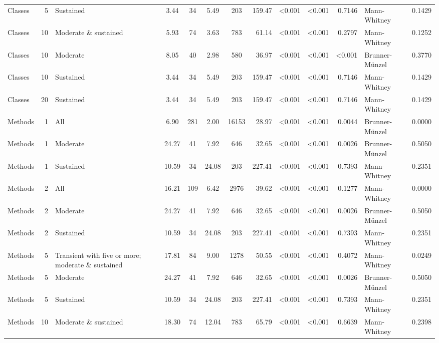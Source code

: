 \begin{table}[H]
{\begin{tabular}{l r p{4cm} c c c c r r r r l r}
Classes & 5 & Sustained &  3.44 & 34 & 5.49 & 203 & 159.47 & \textless 0.001 & \textless 0.001 & 0.7146 &  Mann-Whitney & 0.1429 \\ 
Classes & 10 & Moderate \& sustained &  5.93 & 74 & 3.63 & 783 & 61.14 & \textless 0.001 & \textless 0.001 & 0.2797 &  Mann-Whitney & 0.1252 \\ 
Classes & 10 & Moderate &  8.05 & 40 & 2.98 & 580 & 36.97 & \textless 0.001 & \textless 0.001 & \textless 0.001 &  Brunner-Münzel & 0.3770 \\ 
Classes & 10 & Sustained &  3.44 & 34 & 5.49 & 203 & 159.47 & \textless 0.001 & \textless 0.001 & 0.7146 &  Mann-Whitney & 0.1429 \\ 
Classes & 20 & Sustained &  3.44 & 34 & 5.49 & 203 & 159.47 & \textless 0.001 & \textless 0.001 & 0.7146 &  Mann-Whitney & 0.1429 \\ 
Methods & 1 & All &  6.90 & 281 & 2.00 & 16153 & 28.97 & \textless 0.001 & \textless 0.001 & 0.0044 &  Brunner-Münzel & 0.0000 \\ 
Methods & 1 & Moderate &  24.27 & 41 & 7.92 & 646 & 32.65 & \textless 0.001 & \textless 0.001 & 0.0026 &  Brunner-Münzel & 0.5050 \\ 
Methods & 1 & Sustained &  10.59 & 34 & 24.08 & 203 & 227.41 & \textless 0.001 & \textless 0.001 & 0.7393 &  Mann-Whitney & 0.2351 \\ 
Methods & 2 & All &  16.21 & 109 & 6.42 & 2976 & 39.62 & \textless 0.001 & \textless 0.001 & 0.1277 &  Mann-Whitney & 0.0000 \\ 
Methods & 2 & Moderate &  24.27 & 41 & 7.92 & 646 & 32.65 & \textless 0.001 & \textless 0.001 & 0.0026 &  Brunner-Münzel & 0.5050 \\ 
Methods & 2 & Sustained &  10.59 & 34 & 24.08 & 203 & 227.41 & \textless 0.001 & \textless 0.001 & 0.7393 &  Mann-Whitney & 0.2351 \\ 
Methods & 5 & Transient with five or more; moderate \& sustained &  17.81 & 84 & 9.00 & 1278 & 50.55 & \textless 0.001 & \textless 0.001 & 0.4072 &  Mann-Whitney & 0.0249 \\ 
Methods & 5 & Moderate &  24.27 & 41 & 7.92 & 646 & 32.65 & \textless 0.001 & \textless 0.001 & 0.0026 &  Brunner-Münzel & 0.5050 \\ 
Methods & 5 & Sustained &  10.59 & 34 & 24.08 & 203 & 227.41 & \textless 0.001 & \textless 0.001 & 0.7393 &  Mann-Whitney & 0.2351 \\ 
Methods & 10 & Moderate \& sustained &  18.30 & 74 & 12.04 & 783 & 65.79 & \textless 0.001 & \textless 0.001 & 0.6639 &  Mann-Whitney & 0.2398 \\ 

\end{tabular}}
\end{table}
